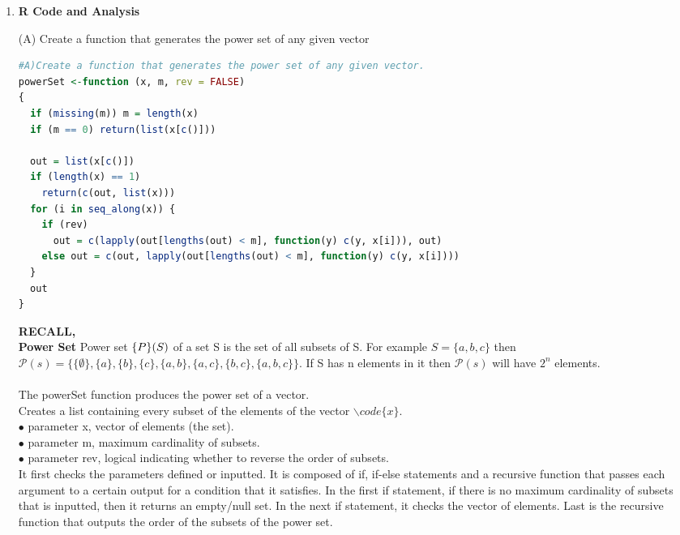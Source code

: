 \documentclass[12pt,letterpaper]{article}
\begin{document}
\begin{enumerate}[label=\Alph*]
\item \textbf{R Code and Analysis}

(A) Create a function that generates the power set of any given vector
\begin{lstlisting}[language=R]
#A)Create a function that generates the power set of any given vector.
powerSet <-function (x, m, rev = FALSE) 
{
  if (missing(m)) m = length(x)
  if (m == 0) return(list(x[c()]))
  
  out = list(x[c()])
  if (length(x) == 1) 
    return(c(out, list(x)))
  for (i in seq_along(x)) {
    if (rev) 
      out = c(lapply(out[lengths(out) < m], function(y) c(y, x[i])), out)
    else out = c(out, lapply(out[lengths(out) < m], function(y) c(y, x[i])))
  }
  out
}
\end{lstlisting}

\textbf{RECALL,}\\
\textbf{Power Set} Power set $\mathcal\{P\}(S)$ of a set S is the set of all subsets of S. For example $S = \{a, b, c\}$ then $\mathcal{P}(s) = \{\{\emptyset\}, \{a\}, \{b\}, \{c\}, \{a, b\}, \{a, c\}, \{b, c\}, \{a, b, c\}\}$. If S has n elements in it then $\mathcal{P}(s)$ will have $2^n$ elements.\\\\
The powerSet function produces the power set of a vector. \\
Creates a list containing every subset of the elements of the vector $\backslash code\{x\}$.\\
$\bullet$ parameter x, vector of elements (the set).\\
$\bullet$ parameter m, maximum cardinality of subsets.\\
$\bullet$ parameter rev, logical indicating whether to reverse the order of subsets.\\

It first checks the parameters defined or inputted. It is composed of if, if-else statements and a recursive function that passes each argument to a certain output for a condition that it satisfies. In the first if statement, if there is no maximum cardinality of subsets that is inputted, then it returns an empty/null set. In the next if statement, it checks the vector of elements. Last is the recursive function that outputs the order of the subsets of the power set.



\end{enumerate}
\end{document}
